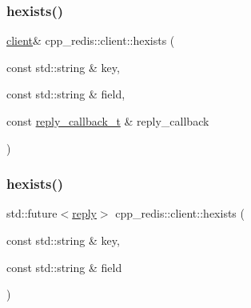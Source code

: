 \mbox{\label{classcpp__redis_1_1client_a36aa37c50e8b5e44e17c4f1f0d2c656e}} 
\subsubsection{\texorpdfstring{hexists()}{hexists()}\hspace{0.1cm}{\footnotesize\ttfamily [1/2]}}
{\footnotesize\ttfamily \hyperlink{classcpp__redis_1_1client}{client}\& cpp\+\_\+redis\+::client\+::hexists (\begin{DoxyParamCaption}\item[{const std\+::string \&}]{key,  }\item[{const std\+::string \&}]{field,  }\item[{const \hyperlink{classcpp__redis_1_1client_a061a1140d36d2eaeda82b09a0bb3f9f2}{reply\+\_\+callback\+\_\+t} \&}]{reply\+\_\+callback }\end{DoxyParamCaption})}

\mbox{\label{classcpp__redis_1_1client_a1fede52ba18414d75f37e776cc62b7f8}} 
\subsubsection{\texorpdfstring{hexists()}{hexists()}\hspace{0.1cm}{\footnotesize\ttfamily [2/2]}}
{\footnotesize\ttfamily std\+::future$<$\hyperlink{classcpp__redis_1_1reply}{reply}$>$ cpp\+\_\+redis\+::client\+::hexists (\begin{DoxyParamCaption}\item[{const std\+::string \&}]{key,  }\item[{const std\+::string \&}]{field }\end{DoxyParamCaption})}

\mbox{\label{classcpp__redis_1_1client_ac1db14da1ab3d1353ce35a1c923979e3}} 
